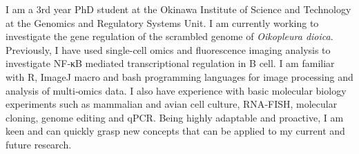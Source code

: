 

\begin{cvparagraph}

I am a 3rd year PhD student at the Okinawa Institute of Science and Technology at the Genomics and Regulatory Systems Unit. I am currently working to investigate the gene regulation of the scrambled genome of \emph{Oikopleura dioica}. Previously, I have used single-cell omics and fluorescence imaging analysis to investigate NF‑κB mediated transcriptional regulation in B cell. I am familiar with R, ImageJ macro and bash programming languages for image processing and analysis of multi‑omics data. I also have experience with basic molecular biology experiments such as mammalian and avian cell culture, RNA‑FISH, molecular cloning, genome editing and qPCR. Being highly adaptable and proactive, I am keen and can quickly grasp new concepts that can be applied to my current and future research.
\end{cvparagraph}
